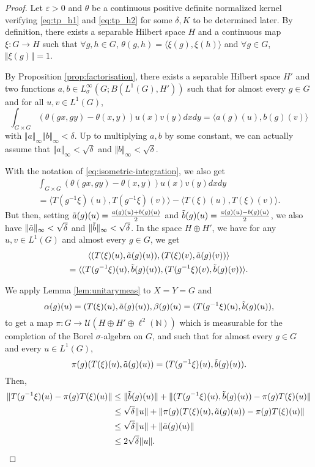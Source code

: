 \documentclass{article}
\theoremstyle{definition}
\theoremstyle{remark}
\numberwithin{equation}{section}
\newcommand{\N}{\mathbb{N}}
\begin{document}
\begin{proof}
    Let $\varepsilon>0$ and $\theta$ be a continuous positive definite normalized kernel verifying \eqref{eq:tp_h1} and \eqref{eq:tp_h2} for some $\delta,K$ to be determined later.
By definition, there exists a separable Hilbert space $H$ and a continuous map $\xi:G\to H$ such that $\forall g,h\in G$, $\theta(g,h)=\langle \xi(g),\xi(h) \rangle$ and $\forall g\in G$, $\Vert \xi(g)\Vert=1$.\medskip

By Proposition \ref{prop:factorisation}, there exists a separable Hilbert space $H'$ and two functions $a,b\in L^\infty_\sigma(G;B(L^1(G),H'))$ such that for almost every $g\in G$ and for all $u,v\in L^1(G)$, $$\int_{G\times G} \left(\theta(gx,gy)-\theta(x,y)\right) u(x)v(y)dxdy = \langle a(g)(u),b(g)(v)\rangle$$ with $\Vert a\Vert_\infty\Vert b\Vert_\infty <\delta$. Up to multiplying $a,b$ by some constant, we can actually assume that $\Vert a\Vert_\infty<\sqrt{\delta}$ and $\Vert b\Vert_\infty<\sqrt{\delta}$. 

With the notation of \eqref{eq:isometric-integration}, we also get \begin{multline*}
\int_{G\times G} \left(\theta(gx,gy)-\theta(x,y)\right) u(x)v(y)dxdy \\
    = \langle T(g^{-1}\xi)(u),T(g^{-1}\xi)(v)\rangle - \langle T(\xi)(u),T(\xi)(v)\rangle.
\end{multline*}
But then, setting $\Tilde{a}(g)(u)=\frac{a(g)(u)+b(g)(u)}{2}$ and $\Tilde{b}(g)(u)=\frac{a(g)(u)-b(g)(u)}{2}$, we also have $\Vert \Tilde{a}\Vert_\infty<\sqrt{\delta}$ and $\Vert \Tilde{b}\Vert_\infty<\sqrt{\delta}$. In the space $H\oplus H'$, we have for any $u,v\in L^1(G)$ and almost every $g\in G$, we get \begin{multline*}\langle (T(\xi)(u),\Tilde{a}(g)(u)),(T(\xi)(v),\Tilde{a}(g)(v))\rangle \\=\langle (T(g^{-1}\xi)(u),\Tilde{b}(g)(u)),(T(g^{-1}\xi)(v),\Tilde{b}(g)(v))\rangle.\end{multline*}

We apply Lemma \ref{lem:unitarymeas} to $X=Y=G$ and $$\alpha(g)(u)=(T(\xi)(u),\Tilde{a}(g)(u)), \beta(g)(u)=(T(g^{-1}\xi)(u),\Tilde{b}(g)(u)),$$ to get a map $\pi:G\to \mathcal{U}(H\oplus H'\oplus \ell^2(\N))$ which is measurable for the completion of the Borel $\sigma$-algebra on $G$, and such that for almost every $g\in G$ and every $u\in L^1(G)$, \begin{equation}
    \label{eq:pialmostrep}\pi(g)(T(\xi)(u),\Tilde{a}(g)(u))=(T(g^{-1}\xi)(u),\Tilde{b}(g)(u)).
\end{equation}Then, \begin{align*}
    \Vert T(g^{-1}\xi)(u) - \pi(g)T(\xi)(u) \Vert & \leq  \Vert \Tilde{b}(g)(u)\Vert+\Vert(T(g^{-1}\xi)(u),\Tilde{b}(g)(u))-\pi(g)T(\xi)(u) \Vert  \\
     & \leq \sqrt{\delta}\Vert u\Vert + \Vert \pi(g)(T(\xi)(u),\Tilde{a}(g)(u))-\pi(g)T(\xi)(u)\Vert\\
     & \leq  \sqrt{\delta}\Vert u\Vert+\Vert \Tilde{a}(g)(u)\Vert\\
     & \leq 2\sqrt{\delta}\Vert u\Vert.
\end{align*}


\end{proof}
\end{document}
